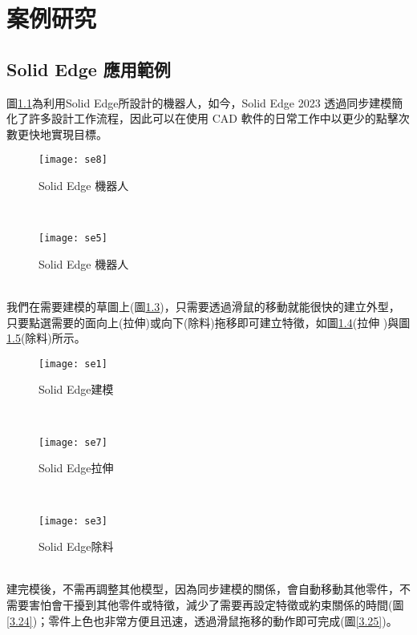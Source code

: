 \chapter{案例研究}
\section{Solid Edge 應用範例}
圖\ref{3.20}為利用Solid Edge所設計的機器人，如今，Solid Edge 2023 透過同步建模簡化了許多設計工作流程，因此可以在使用 CAD 軟件的日常工作中以更少的點擊次數更快地實現目標。\\
\begin{figure}[hbt!]
\begin{center}
\texttt{[image: se8]}
\caption{\Large Solid Edge 機器人}\label{3.20}
\end{center}
\end{figure}
\\
\begin{figure}[hbt!]
\begin{center}
\texttt{[image: se5]}
\caption{\Large Solid Edge 機器人}\label{3.27}
\end{center}
\end{figure}
\\
我們在需要建模的草圖上(圖\ref{3.21})，只需要透過滑鼠的移動就能很快的建立外型，只要點選需要的面向上(拉伸)或向下(除料)拖移即可建立特徵，如圖\ref{3.22}(拉伸 )與圖\ref{3.23}(除料)所示。\\
\begin{figure}[hbt!]
\begin{center}
\texttt{[image: se1]}
\caption{\Large Solid Edge建模}\label{3.21}
\end{center}
\end{figure}
\\
\begin{figure}[hbt!]
\begin{center}
\texttt{[image: se7]}
\caption{\Large Solid Edge拉伸}\label{3.22}
\end{center}
\end{figure}
\\
\begin{figure}[hbt!]
\begin{center}
\texttt{[image: se3]}
\caption{\Large Solid Edge除料}\label{3.23}
\end{center}
\end{figure}
\\
建完模後，不需再調整其他模型，因為同步建模的關係，會自動移動其他零件，不需要害怕會干擾到其他零件或特徵，減少了需要再設定特徵或約束關係的時間(圖\ref{3.24})；零件上色也非常方便且迅速，透過滑鼠拖移的動作即可完成(圖\ref{3.25})。\\
